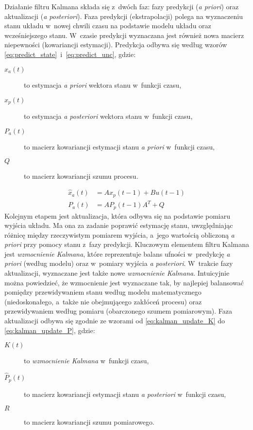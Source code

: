 Działanie filtru Kalmana składa się z~dwóch faz: fazy predykcji (\textit{a
priori}) oraz aktualizacji (\textit{a posteriori}).
Faza predykcji (ekstrapolacji) polega na wyznaczeniu stanu układu w~nowej
chwili czasu na podstawie modelu układu oraz wcześniejszego stanu.
W~czasie predykcji wyznaczana jest również nowa macierz niepewności
(kowariancji estymacji).
Predykcja odbywa się według wzorów
\ref{eq:predict_state}~i~\ref{eq:predict_unc}, gdzie:
\begin{description}
	\item[$\hat{x}_a\left(t\right)$] to estymacja \textit{a priori} wektora stanu
	w~funkcji czasu,
	\item[$\hat{x}_p\left(t\right)$] to estymacja \textit{a posteriori} wektora
	stanu w~funkcji czasu,
	\item[$P_a\left(t\right)$] to macierz kowariancji estymacji stanu \textit{a
	priori} w~funkcji czasu,
	\item[$Q$] to macierz kowariancji szumu procesu.
\end{description}
\begin{align}
	\hat{x}_a\left(t\right) &= A\hat{x}_p\left(t-1\right) + Bu\left(t-1\right)
	\label{eq:predict_state} \\
	P_a\left(t\right) &= AP_p\left(t-1\right)A^T + Q
	\label{eq:predict_unc}
\end{align}
Kolejnym etapem jest aktualizacja, która odbywa się na podstawie pomiaru
wyjścia układu.
Ma ona za zadanie poprawić estymację stanu, uwzględniając różnicę między
rzeczywistym pomiarem wyjścia, a~jego wartością obliczoną \textit{a priori}
przy pomocy stanu z~fazy predykcji.
Kluczowym elementem filtru Kalmana jest \textit{wzmocnienie Kalmana}, które
reprezentuje balans ufności w~predykcję \textit{a priori} (według modelu) oraz
w~pomiary wyjścia \textit{a posteriori}.
W~trakcie fazy aktualizacji, wyznaczane jest także nowe
\textit{wzmocnienie Kalmana}.
Intuicyjnie można powiedzieć, że wzmocnienie jest wyznaczane tak, by najlepiej
balansować pomiędzy przewidywaniem stanu według modelu matematycznego
(niedoskonałego, a~także nie obejmującego zakłóceń procesu) oraz przewidywaniem
według pomiaru (obarczonego szumem pomiarowym).
Faza aktualizacji odbywa się zgodnie ze wzorami od \ref{eq:kalman_update_K} do
\ref{eq:kalman_update_P}, gdzie:
\begin{description}
	\item[$K\left(t\right)$] to \textit{wzmocnienie Kalmana} w~funkcji czasu,
	\item[$\hat{P}_p\left(t\right)$] to macierz kowariancji estymacji stanu
	\textit{a posteriori} w~funkcji czasu,
	\item[$R$] to macierz kowariancji szumu pomiarowego.
\end{description}
